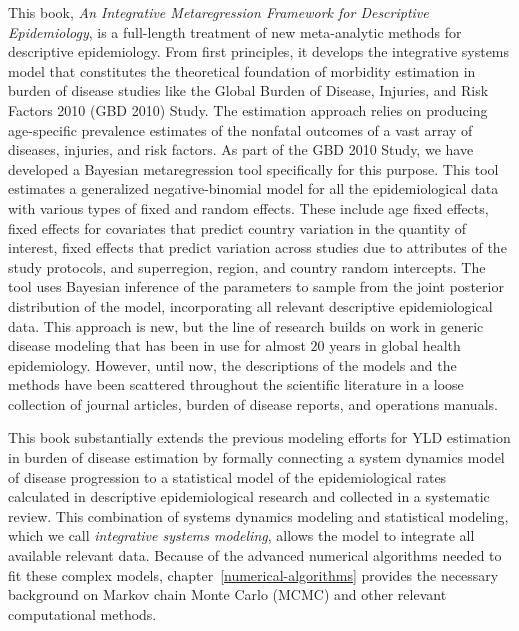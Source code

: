 This book, \emph{An Integrative Metaregression Framework for Descriptive
  Epidemiology}, is a full-length treatment of new meta-analytic
methods for descriptive epidemiology.  From first principles, it
develops the integrative systems model that constitutes the
theoretical foundation of morbidity estimation
in burden of disease studies like the Global Burden of Disease, Injuries, and Risk Factors 2010
 (GBD 2010) Study.  The estimation approach relies on producing
age-specific prevalence estimates of the nonfatal outcomes of a vast
array of diseases, injuries, and risk factors.  As part of the GBD
2010 Study, we have developed a Bayesian metaregression tool
specifically for this purpose. This tool estimates a generalized
negative-binomial model for all the epidemiological data with various
types of fixed and random effects.  These include age fixed effects,
fixed effects for covariates that predict country variation in the
quantity of interest, fixed effects that predict variation across
studies due to attributes of the study protocols, and superregion,
region, and country random intercepts.  The tool uses Bayesian
inference of the parameters to sample from the joint posterior
distribution of the model, incorporating all relevant descriptive
epidemiological data.  This approach is new, but the line of research
builds on work in generic disease modeling that has been in use for
almost $20$ years in global health
epidemiology.\cite{Barendregt_Generic_2003} However, until now, the
descriptions of the models and the methods have been scattered throughout
the scientific literature in a loose collection of journal articles,
burden of disease reports, and operations manuals.

This book substantially extends the previous modeling efforts for YLD
estimation in burden of disease estimation by formally connecting a
system dynamics model of disease progression to a statistical model of
the epidemiological rates calculated in descriptive
epidemiological research and collected in a systematic
review.  This combination of systems dynamics modeling and statistical
modeling, which we call
\emph{integrative systems modeling}, allows the model to integrate all
available relevant data.  Because of the advanced numerical algorithms needed to fit these complex models, chapter~\ref{numerical-algorithms} provides the
necessary background on Markov chain Monte Carlo (MCMC) and other
relevant computational methods.

